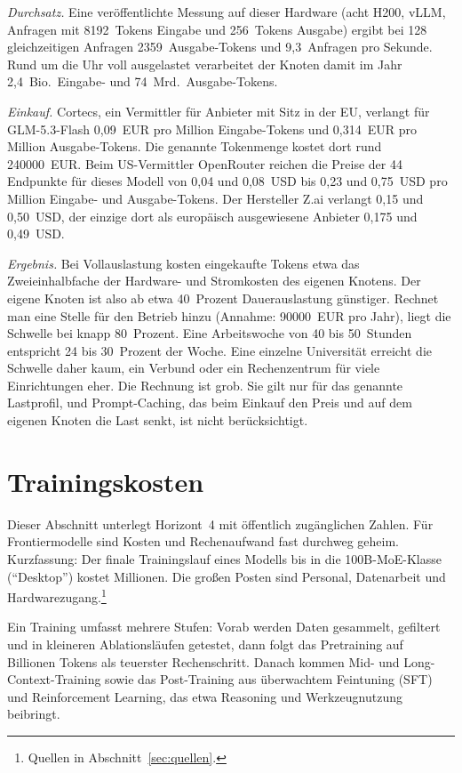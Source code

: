 \documentclass[a4paper,11pt]{article}
\begin{document}
\emph{Durchsatz.}  Eine veröffentlichte Messung auf dieser Hardware
(acht H200, vLLM, Anfragen mit \num{8192}~Tokens Eingabe und
256~Tokens Ausgabe) ergibt bei 128 gleichzeitigen Anfragen
\num{2359}~Ausgabe-Tokens und 9,3~Anfragen pro Sekunde.  Rund um die
Uhr voll ausgelastet verarbeitet der Knoten damit im Jahr 2,4~Bio.\
Eingabe- und 74~Mrd.\ Ausgabe-Tokens.

\emph{Einkauf.}  Cortecs, ein Vermittler für Anbieter mit Sitz in der
EU, verlangt für GLM-5.3-Flash 0,09~EUR pro Million Eingabe-Tokens und
0,314~EUR pro Million Ausgabe-Tokens.  Die genannte Tokenmenge kostet
dort rund \num{240000}~EUR.  Beim US-Vermittler OpenRouter reichen die
Preise der 44 Endpunkte für dieses Modell von 0,04 und 0,08~USD bis
0,23 und 0,75~USD pro Million Eingabe- und Ausgabe-Tokens.  Der
Hersteller Z.ai verlangt 0,15 und 0,50~USD, der einzige dort als
europäisch ausgewiesene Anbieter 0,175 und 0,49~USD.

\emph{Ergebnis.}  Bei Vollauslastung kosten eingekaufte Tokens etwa
das Zweieinhalbfache der Hardware- und Stromkosten des eigenen
Knotens.  Der eigene Knoten ist also ab etwa 40~Prozent
Dauerauslastung günstiger.  Rechnet man eine Stelle für den Betrieb
hinzu (Annahme: \num{90000}~EUR pro Jahr), liegt die Schwelle bei
knapp 80~Prozent.  Eine Arbeitswoche von 40 bis 50~Stunden entspricht
24 bis 30~Prozent der Woche.  Eine einzelne Universität erreicht die
Schwelle daher kaum, ein Verbund oder ein Rechenzentrum für viele
Einrichtungen eher.  Die Rechnung ist grob.  Sie gilt nur für das
genannte Lastprofil, und Prompt-Caching, das beim Einkauf den Preis
und auf dem eigenen Knoten die Last senkt, ist nicht berücksichtigt.

\section{Trainingskosten}
\label{sec:kosten}

Dieser Abschnitt unterlegt Horizont~4 mit öffentlich zugänglichen
Zahlen.  Für Frontiermodelle sind Kosten und Rechenaufwand fast durchweg geheim. Kurzfassung: Der
finale Trainingslauf eines Modells bis in die 100B-MoE-Klasse
(\enquote{Desktop}) kostet Millionen. Die großen Posten sind Personal,
Datenarbeit und Hardwarezugang.\footnote{Quellen in
  Abschnitt~\ref{sec:quellen}.}

Ein Training umfasst mehrere Stufen: Vorab werden Daten gesammelt,
gefiltert und in kleineren Ablationsläufen getestet, dann folgt das
Pretraining auf Billionen Tokens als teuerster Rechenschritt. Danach
kommen Mid- und Long-Context-Training sowie das Post-Training aus
überwachtem Feintuning (SFT) und Reinforcement Learning, das etwa
Reasoning und Werkzeugnutzung beibringt.
\end{document}
